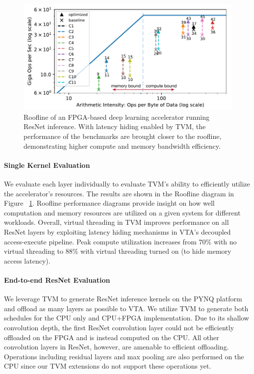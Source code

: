\documentclass[sigconf]{acmart}
\begin{document}
\begin{figure}[!t]
\centering
\includegraphics[width=0.9\columnwidth]{figures/vta_roofline}
\caption{\small{Roofline of an FPGA-based deep learning accelerator running ResNet inference. With latency hiding enabled by TVM, the performance of the benchmarks are brought closer to the roofline, demonstrating higher compute and memory bandwidth efficiency.}}
\label{fig:fpga_latencyhiding}
\end{figure}

\paragraph{Single Kernel Evaluation}
We evaluate each layer individually to evaluate TVM's ability to efficiently utilize the accelerator's resources.
The results are shown in the Roofline diagram in Figure ~\ref{fig:fpga_latencyhiding}.
Roofline performance diagrams provide insight on how well computation and memory resources are utilized on a given system for different workloads.
Overall, virtual threading in TVM improves performance on all ResNet layers by exploiting latency hiding mechanisms in VTA's decoupled access-execute pipeline.
Peak compute utilization increases from 70\% with no virtual threading to 88\% with virtual threading turned on (to hide memory access latency).

\paragraph{End-to-end ResNet Evaluation}
We leverage TVM to generate ResNet inference kernels on the PYNQ platform and offload as many layers as possible to VTA.
We utilize TVM to generate both schedules for the CPU only and CPU+FPGA implementation.
Due to its shallow convolution depth, the first ResNet convolution layer could not be efficiently offloaded on the FPGA and is instead computed on the CPU.
All other convolution layers in ResNet, however, are amenable to efficient offloading.
Operations including residual layers and max pooling are also performed on the CPU since our TVM extensions do not support these operations yet.
\end{document}
